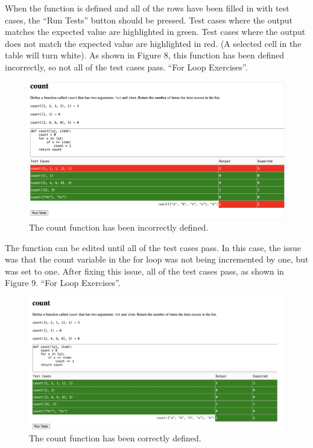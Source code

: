\documentclass[10pt,twocolumn]{article}
\begin{document}
When the function is defined and all of the rows have been filled in with test cases, the \enquote{Run Tests} button should be pressed. Test cases where the output matches the expected value are highlighted in green. Test cases where the output does not match the expected value are highlighted in red. (A selected cell in the table will turn white). As shown in Figure 8, this function has been defined incorrectly, so not all of the test cases pass.
\enquote{For Loop Exercises}.
\begin{figure}
    \centering
    \includegraphics[width=.95\linewidth]{incorrect.png}
    \caption{
        The count function has been incorrectly defined.
    }
    \label{fig:first-page}
\end{figure}

The function can be edited until all of the test cases pass. In this case, the issue was that the count variable in the for loop was not being incremented by one, but was set to one. After fixing this issue, all of the test cases pass, as shown in Figure 9.
\enquote{For Loop Exercises}.
\begin{figure}
    \centering
    \includegraphics[width=.95\linewidth]{correct.png}
    \caption{
        The count function has been correctly defined.
    }
    \label{fig:first-page}
\end{figure}
\end{document}
